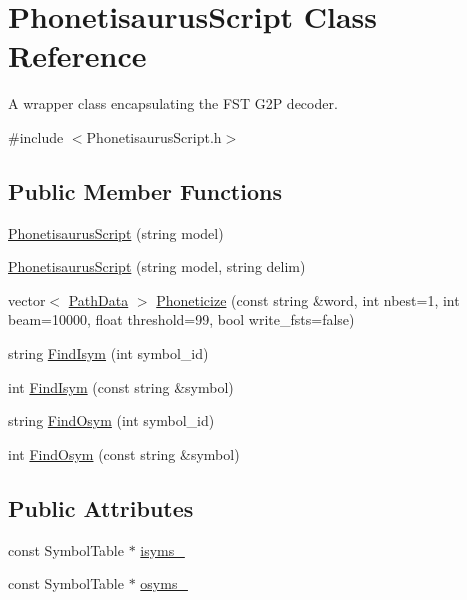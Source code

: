\hypertarget{class_phonetisaurus_script}{}\section{Phonetisaurus\+Script Class Reference}
\label{class_phonetisaurus_script}


A wrapper class encapsulating the F\+ST G2P decoder.  




{\ttfamily \#include $<$Phonetisaurus\+Script.\+h$>$}

\subsection*{Public Member Functions}
\begin{DoxyCompactItemize}
\item 
\hyperlink{class_phonetisaurus_script_a1a6f924ab66280d70e91b145b3b8e2d5}{Phonetisaurus\+Script} (string model)
\item 
\hyperlink{class_phonetisaurus_script_a3cf069b57a75e4fabfe329b196256388}{Phonetisaurus\+Script} (string model, string delim)
\item 
vector$<$ \hyperlink{struct_path_data}{Path\+Data} $>$ \hyperlink{class_phonetisaurus_script_a8b6e087392ce3dad8b55deab60e83184}{Phoneticize} (const string \&word, int nbest=1, int beam=10000, float threshold=99, bool write\+\_\+fsts=false)
\item 
string \hyperlink{class_phonetisaurus_script_a58be2ae446c1fd8ecab16da2631353fd}{Find\+Isym} (int symbol\+\_\+id)
\item 
int \hyperlink{class_phonetisaurus_script_a99238d9701b81155457e384bf0fcb420}{Find\+Isym} (const string \&symbol)
\item 
string \hyperlink{class_phonetisaurus_script_a9703081b0184951fbee774e86037e8ca}{Find\+Osym} (int symbol\+\_\+id)
\item 
int \hyperlink{class_phonetisaurus_script_a5af05d0e0e06a33bb2932c00d28d293e}{Find\+Osym} (const string \&symbol)
\end{DoxyCompactItemize}
\subsection*{Public Attributes}
\begin{DoxyCompactItemize}
\item 
const Symbol\+Table $\ast$ \hyperlink{class_phonetisaurus_script_a892a638e7981500caad3a318a25bac32}{isyms\+\_\+}
\item 
const Symbol\+Table $\ast$ \hyperlink{class_phonetisaurus_script_a1f9565aaef49b7c312c3eacc7b3d97ac}{osyms\+\_\+}
\end{DoxyCompactItemize}


